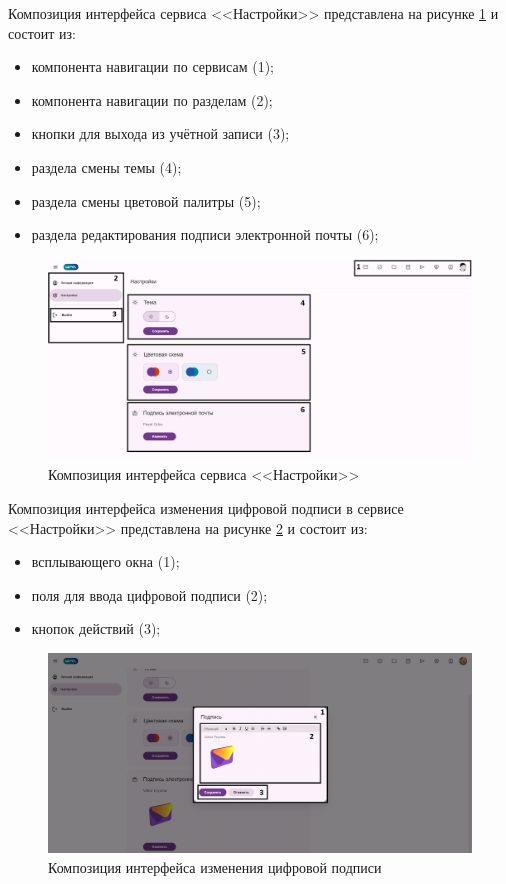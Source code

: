 Композиция интерфейса сервиса <<Настройки>> представлена на рисунке \ref{templ:image6} и состоит из:
\begin{itemize}
  \item компонента навигации по сервисам (1);
  \item компонента навигации по разделам (2);
  \item кнопки для выхода из учётной записи (3);
  \item раздела смены темы (4);
  \item раздела смены цветовой палитры (5);
  \item раздела редактирования подписи электронной почты (6);
\end{itemize}
\begin{figure}[H]
	\centering
	\includegraphics[width=1\linewidth]{images/настройки}
	\caption{Композиция интерфейса сервиса <<Настройки>>}
	\label{templ:image6}
\end{figure}

Композиция интерфейса изменения цифровой подписи в сервисе <<Настройки>> представлена на рисунке \ref{templ:image6b} и состоит из:
\begin{itemize}
  \item всплывающего окна (1);
  \item поля для ввода цифровой подписи (2);
  \item кнопок действий (3);
\end{itemize}
\begin{figure}[H]
	\centering
	\includegraphics[width=1\linewidth]{images/настройки2}
	\caption{Композиция интерфейса изменения цифровой подписи}
	\label{templ:image6b}
\end{figure}

